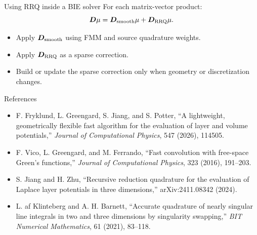 \documentclass[aspectratio=169,11pt]{beamer}
\begin{document}
\begin{frame}{Using RRQ inside a BIE solver}
\small
For each matrix-vector product:
\[
  \bm D\mu
  =
  \bm D_{\rm smooth}\mu
  +
  \bm D_{\rm RRQ}\mu.
\]

\begin{itemize}
  \item Apply $\bm D_{\rm smooth}$ using FMM and source quadrature weights.
  \item Apply $\bm D_{\rm RRQ}$ as a sparse correction.
  \item Build or update the sparse correction only when geometry or discretization
  changes.
\end{itemize}
\end{frame}

\begin{frame}{References}
\small
\begin{itemize}
  \item F. Fryklund, L. Greengard, S. Jiang, and S. Potter,
  ``A lightweight, geometrically flexible fast algorithm for the evaluation of
  layer and volume potentials,'' \emph{Journal of Computational Physics},
  547 (2026), 114505.
  \item F. Vico, L. Greengard, and M. Ferrando,
  ``Fast convolution with free-space Green's functions,''
  \emph{Journal of Computational Physics}, 323 (2016), 191--203.
  \item S. Jiang and H. Zhu, ``Recursive reduction quadrature for the evaluation
  of Laplace layer potentials in three dimensions,'' arXiv:2411.08342 (2024).
  \item L. af Klinteberg and A. H. Barnett, ``Accurate quadrature of nearly
  singular line integrals in two and three dimensions by singularity swapping,''
  \emph{BIT Numerical Mathematics}, 61 (2021), 83--118.
\end{itemize}
\end{frame}
\end{document}
